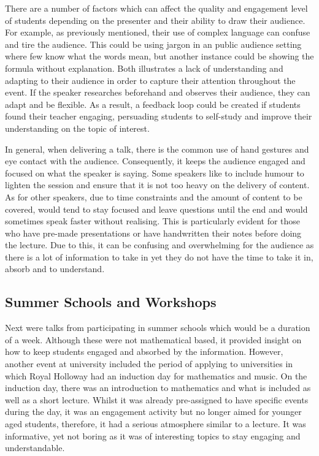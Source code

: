 \documentclass[12pt, a4paper,oneside]{book}
\numberwithin{equation}{section}
\begin{document}
There are a number of factors which can affect the quality and engagement level of students depending on the presenter and their ability to draw their audience. For example, as previously mentioned, their use of complex language can confuse and tire the audience. This could be using jargon in an public audience setting where few know what the words mean, but another instance could be showing the formula without explanation. Both illustrates a lack of understanding and adapting to their audience in order to capture their attention throughout the event. If the speaker researches beforehand and observes their audience, they can adapt and be flexible. As a result, a feedback loop could be created if students found their teacher engaging, persuading students to self-study and improve their understanding on the topic of interest.

In general, when delivering a talk, there is the common use of hand gestures and eye contact with the audience. Consequently, it keeps the audience engaged and focused on what the speaker is saying. Some speakers like to include humour to lighten the {\color{red}session} and ensure that it is not too heavy on the delivery of content. As for other speakers, due to time constraints and the amount of content to be covered, would tend to stay focused and leave questions until the end and would sometimes speak faster without realising. This is particularly evident for those who have pre-made presentations or have handwritten their notes before {\color{red}doing} the lecture. Due to this, it can be confusing and overwhelming for the audience as there is a lot of information to take in yet they do not have the time to take it in, absorb and to understand.

\subsection{Summer Schools and Workshops}
Next were talks from participating in summer schools which would be a duration of a week. Although these were not mathematical based, it provided insight on how to keep students engaged and {\color{red}absorbed} by the information. However, another event at university included the period of applying to universities in which Royal Holloway had an induction day for mathematics and music. On the induction day, there was an introduction to mathematics and what is included as well as a short lecture. Whilst it was already pre-assigned to have specific events during the day, it was an engagement activity but no longer aimed for younger aged students, therefore, it had a serious atmosphere similar to a lecture. It was informative, yet not boring as it was of interesting topics to stay engaging and understandable.
\end{document}
